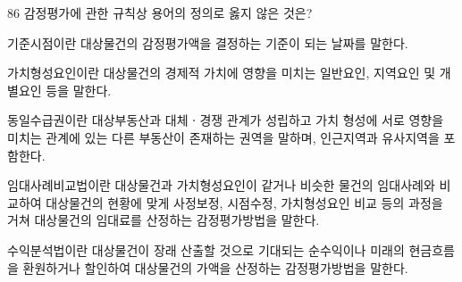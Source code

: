 \begin{question}{86}
감정평가에 관한 규칙상 용어의 정의로 옳지 않은 것은?
\begin{choices}
  \item 기준시점이란 대상물건의 감정평가액을 결정하는 기준이 되는 날짜를 말한다.
  \item 가치형성요인이란 대상물건의 경제적 가치에 영향을 미치는 일반요인, 지역요인 및 개별요인 등을 말한다.
  \item 동일수급권이란 대상부동산과 대체ㆍ경쟁 관계가 성립하고 가치 형성에 서로 영향을 미치는 관계에 있는 다른 부동산이 존재하는 권역을 말하며, 인근지역과 유사지역을 포함한다.
  \item 임대사례비교법이란 대상물건과 가치형성요인이 같거나 비슷한 물건의 임대사례와 비교하여 대상물건의 현황에 맞게 사정보정, 시점수정, 가치형성요인 비교 등의 과정을 거쳐 대상물건의 임대료를 산정하는 감정평가방법을 말한다.
  \item 수익분석법이란 대상물건이 장래 산출할 것으로 기대되는 순수익이나 미래의 현금흐름을 환원하거나 할인하여 대상물건의 가액을 산정하는 감정평가방법을 말한다.
\end{choices}
\end{question}
